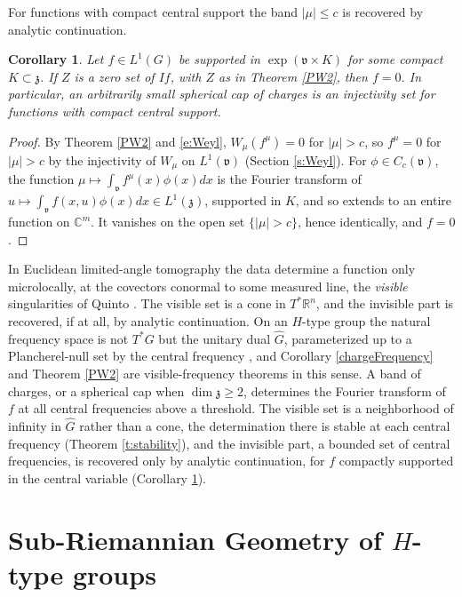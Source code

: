 \documentclass[11pt]{amsart}
\theoremstyle{plain}
\newtheorem{corollary}[theorem]{Corollary}
\theoremstyle{definition}
\theoremstyle{remark}
\numberwithin{equation}{section}
\def\fz{\mathfrak{z}}
\def\fv{\mathfrak{v}}
\def\R{{\mathbb R}}%
\def\C{{\mathbb C}}%
\numberwithin{equation}{section}
\begin{document}
For functions with compact central support the band $|\mu|\leq c$ is recovered by analytic continuation.
\begin{corollary}\label{c:centralSupport}
	Let $f\in L^1(G)$ be supported in $\exp(\fv\times K)$ for some compact $K\subset \fz$. If $Z$ is a zero set of $If$, with $Z$ as in Theorem \ref{PW2}, then $f=0$. In particular, an arbitrarily small spherical cap of charges is an injectivity set for functions with compact central support.
\end{corollary}

\begin{proof}
	By Theorem \ref{PW2} and \eqref{e:Weyl}, $W_\mu(f^\mu)=0$ for $|\mu|>c$, so $f^\mu=0$ for $|\mu|>c$ by the injectivity of $W_\mu$ on $L^1(\fv)$ (Section \ref{s:Weyl}). For $\phi\in C_c(\fv)$, the function $\mu\mapsto \int_\fv f^\mu(x)\phi(x)dx$ is the Fourier transform of $u\mapsto \int_\fv f(x, u)\phi(x)dx\in L^1(\fz)$, supported in $K$, and so extends to an entire function on $\C^m$. It vanishes on the open set $\{|\mu|>c\}$, hence identically, and $f=0$.
\end{proof}

In Euclidean limited-angle tomography the data determine a function only microlocally, at the covectors conormal to some measured line, the \textit{visible} singularities of Quinto \cite{quintoSingularitiesXrayTransform1993}. The visible set is a cone in $T^*\R^n$, and the invisible part is recovered, if at all, by analytic continuation. On an $H$-type group the natural frequency space is not $T^*G$ but the unitary dual $\widehat G$, parameterized up to a Plancherel-null set by the central frequency \cite{bahouriFrequencySpaceHeisenberg2019, fischerQuantizationNilpotentLie2016}, and Corollary \ref{chargeFrequency} and Theorem \ref{PW2} are visible-frequency theorems in this sense. A band of charges, or a spherical cap when $\dim\fz\geq2$, determines the Fourier transform of $f$ at all central frequencies above a threshold. The visible set is a neighborhood of infinity in $\widehat G$ rather than a cone, the determination there is stable at each central frequency (Theorem \ref{t:stability}), and the invisible part, a bounded set of central frequencies, is recovered only by analytic continuation, for $f$ compactly supported in the central variable (Corollary \ref{c:centralSupport}).


\section{Sub-Riemannian Geometry of $H$-type groups}\label{sRGeometry}
\end{document}
